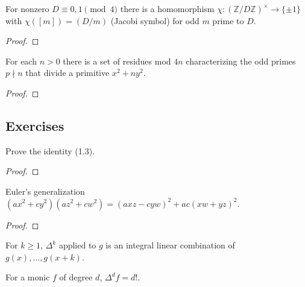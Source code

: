 \begin{theorem}
  \label{lem:quadraticChar}
  \leanok
  For nonzero $D \equiv 0,1 \pmod 4$ there is a homomorphism
  $\chi : (\mathbb Z/D\mathbb Z)^\times \to \{\pm 1\}$ with $\chi([m]) = (D/m)$
  (Jacobi symbol) for odd $m$ prime to $D$.
\end{theorem}
\begin{proof}
\end{proof}

\begin{theorem}
  \label{thm:reciprocity_step}
  \leanok
  For each $n>0$ there is a set of residues mod $4n$ characterizing the odd
  primes $p \nmid n$ that divide a primitive $x^2+ny^2$.
\end{theorem}
\begin{proof}
\end{proof}

\subsection{Exercises}

\begin{theorem}[Exercise 1.1(a)]
  \label{exr:s1_1_a}
  \leanok
  Prove the identity (1.3).
\end{theorem}
\begin{proof}\end{proof}

\begin{theorem}[Exercise 1.1(b)]
  \label{exr:s1_1_b}
  \leanok
  Euler's generalization
  $(ax^2+cy^2)(az^2+cw^2) = (axz - cyw)^2 + ac(xw + yz)^2$.
\end{theorem}
\begin{proof}\end{proof}

\begin{theorem}[Exercise 1.2(a)]
  \label{exr:s1_2_a}
  \leanok
  For $k \ge 1$, $\Delta^k$ applied to $g$ is an integral linear combination of
  $g(x), \dots, g(x+k)$.
\end{theorem}

\begin{theorem}[Exercise 1.2(b)]
  \label{exr:s1_2_b}
  \leanok
  For a monic $f$ of degree $d$, $\Delta^d f = d!$.
\end{theorem}

